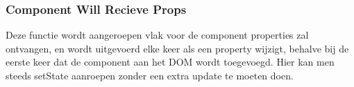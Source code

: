 	\subsubsection{Component Will Recieve Props}
		
		Deze functie wordt aangeroepen vlak voor de component properties zal ontvangen, en wordt uitgevoerd elke keer als een property wijzigt, behalve bij de eerste keer dat de component aan het DOM wordt toegevoegd. Hier kan men steeds setState aanroepen zonder een extra update te moeten doen.
